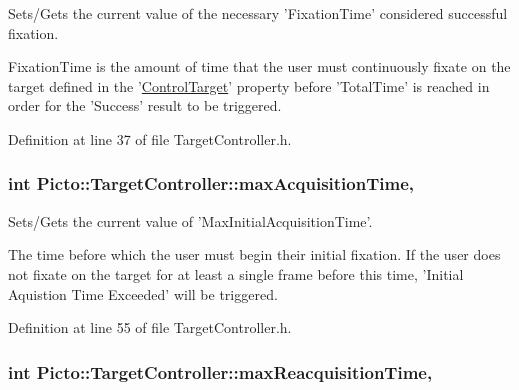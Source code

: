 Sets/\-Gets the current value of the necessary 'Fixation\-Time' considered successful fixation. 

Fixation\-Time is the amount of time that the user must continuously fixate on the target defined in the '\hyperlink{class_picto_1_1_control_target}{Control\-Target}' property before 'Total\-Time' is reached in order for the 'Success' result to be triggered. 

Definition at line 37 of file Target\-Controller.\-h.

\hypertarget{class_picto_1_1_target_controller_a46d2f73fe5b79a70c39a97976c9e38e6}{
\subsubsection[{max\-Acquisition\-Time}]{\setlength{\rightskip}{0pt plus 5cm}int Picto\-::\-Target\-Controller\-::max\-Acquisition\-Time\hspace{0.3cm}{\ttfamily [read]}, {\ttfamily [write]}}}\label{class_picto_1_1_target_controller_a46d2f73fe5b79a70c39a97976c9e38e6}


Sets/\-Gets the current value of 'Max\-Initial\-Acquisition\-Time'. 

The time before which the user must begin their initial fixation. If the user does not fixate on the target for at least a single frame before this time, 'Initial Aquistion Time Exceeded' will be triggered. 

Definition at line 55 of file Target\-Controller.\-h.

\hypertarget{class_picto_1_1_target_controller_abedf5945d75df7b30414bfaf6dff6dc5}{
\subsubsection[{max\-Reacquisition\-Time}]{\setlength{\rightskip}{0pt plus 5cm}int Picto\-::\-Target\-Controller\-::max\-Reacquisition\-Time\hspace{0.3cm}{\ttfamily [read]}, {\ttfamily [write]}}}\label{class_picto_1_1_target_controller_abedf5945d75df7b30414bfaf6dff6dc5}


